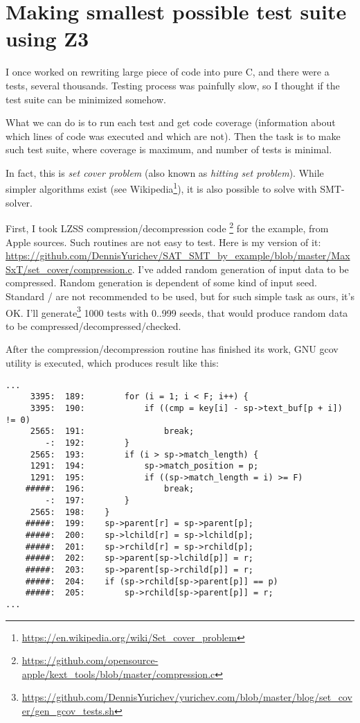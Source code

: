 \section{Making smallest possible test suite using Z3}
\label{set_cover}

I once worked on rewriting large piece of code into pure C, and there were a tests, several thousands.
Testing process was painfully slow, so I thought if the test suite can be minimized somehow.

What we can do is to run each test and get code coverage
(information about which lines of code was executed and which are not).
Then the task is to make such test suite, where coverage is maximum, and number of tests is minimal.

In fact, this is \emph{set cover problem} (also known as \emph{hitting set problem}).
While simpler algorithms exist (see Wikipedia\footnote{\url{https://en.wikipedia.org/wiki/Set_cover_problem}}),
it is also possible to solve with SMT-solver.

First, I took \ac{LZSS} compression/decompression code
\footnote{\url{https://github.com/opensource-apple/kext_tools/blob/master/compression.c}} for the example,
from Apple sources.
Such routines are not easy to test.
Here is my version of it:
\url{https://github.com/DennisYurichev/SAT_SMT_by_example/blob/master/MaxSxT/set_cover/compression.c}.
I've added random generation of input data to be compressed.
Random generation is dependent of some kind of input seed.
Standard / are not recommended to be used, but for such simple task as ours, it's OK.
I'll generate\footnote{\url{https://github.com/DennisYurichev/yurichev.com/blob/master/blog/set_cover/gen_gcov_tests.sh}}
1000 tests with 0..999 seeds, that would produce random data to be compressed/decompressed/checked.

After the compression/decompression routine has finished its work,
GNU gcov utility is executed, which produces result like this:

\begin{lstlisting}
...
     3395:  189:        for (i = 1; i < F; i++) {
     3395:  190:            if ((cmp = key[i] - sp->text_buf[p + i]) != 0)
     2565:  191:                break;
        -:  192:        }
     2565:  193:        if (i > sp->match_length) {
     1291:  194:            sp->match_position = p;
     1291:  195:            if ((sp->match_length = i) >= F)
    #####:  196:                break;
        -:  197:        }
     2565:  198:    }
    #####:  199:    sp->parent[r] = sp->parent[p];
    #####:  200:    sp->lchild[r] = sp->lchild[p];
    #####:  201:    sp->rchild[r] = sp->rchild[p];
    #####:  202:    sp->parent[sp->lchild[p]] = r;
    #####:  203:    sp->parent[sp->rchild[p]] = r;
    #####:  204:    if (sp->rchild[sp->parent[p]] == p)
    #####:  205:        sp->rchild[sp->parent[p]] = r;
...
\end{lstlisting}


